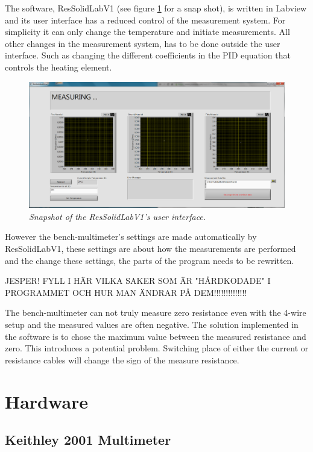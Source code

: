 \documentclass[a4paper,12pt]{article}
\begin{document}
The software, ResSolidLabV1 (see figure \ref{fig:UI} for a snap shot), is written in Labview and its user interface has a reduced control of the measurement system. For simplicity it can only change the temperature and initiate measurements. All other changes in the measurement system, has to be done outside the user interface. Such as changing the different coefficients in the PID equation that controls the heating element. 


\begin{figure}[H]
\center
\includegraphics[width=1\textwidth]{ResSolidLabV1UI}
\caption{\emph{Snapshot of the ResSolidLabV1's user interface.}}
\label{fig:UI}
\end{figure}

However the bench-multimeter's settings are made automatically by ResSolidLabV1, these settings are about how the measurements are performed and the change these settings, the parts of the program needs to be rewritten.

JESPER! FYLL I HÄR VILKA SAKER SOM ÄR "HÅRDKODADE" I PROGRAMMET OCH HUR MAN ÄNDRAR PÅ DEM!!!!!!!!!!!!!!

The  bench-multimeter can not truly measure zero resistance even with the 4-wire setup and the measured values are often negative. The solution implemented in the software is to chose the maximum value between the measured resistance and zero. This introduces a potential problem. Switching place of either the current or resistance cables will change the sign of the measure resistance.


\section{Hardware}

\subsection{Keithley 2001 Multimeter}
\end{document}
